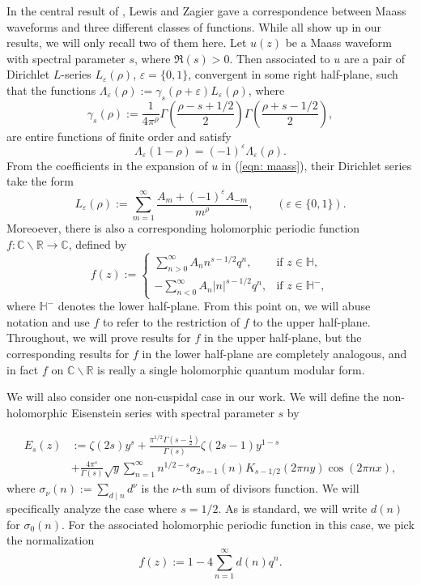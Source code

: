 \documentclass[12pt]{amsart}
\theoremstyle{definition}
\theoremstyle{plain}
\numberwithin{equation}{section}
\begin{document}
In the central result of \cite{lewis-zagier}, Lewis and Zagier gave a correspondence between Maass waveforms and three different classes of functions. 
While all show up in our results, we will only recall two of them here. Let $u(z)$ be a Maass waveform with spectral parameter $s$, where $\Re(s)>0$.
Then associated to $u$ are a pair of Dirichlet $L$-series $L_\varepsilon(\rho)$, $\varepsilon = \{0, 1\}$, convergent in some
right half-plane, such that the functions $\Lambda_{\varepsilon}(\rho) :=  \gamma_s(\rho+\varepsilon)L_\varepsilon(\rho)$, where
\[\gamma_s(\rho) := \frac{1}{4\pi^\rho}\Gamma\left(\frac{\rho-s+1/2}{2}\right) \Gamma\left(\frac{\rho+s-1/2}{2}\right),
\]
are entire functions of finite order and satisfy 
\[\Lambda_\varepsilon(1-\rho) = (-1)^\varepsilon \Lambda_\varepsilon(\rho).
\]
From the coefficients in the expansion of $u$ in (\ref{eqn: maass}), their Dirichlet series take the form
\[L_\varepsilon(\rho) := \sum_{m=1}^\infty \frac{A_m + (-1)^\varepsilon A_{-m}}{m^\rho}, \quad \quad (\varepsilon \in \{0,1\}). \]
Moreoever, there is also a corresponding holomorphic periodic function $f\colon \mathbb{C}\backslash \mathbb{R} \to \mathbb{C}$, defined by
\[f(z) := \begin{cases} \sum_{n>0}^\infty A_n n^{s-1/2} q^n, & \text{if } z \in \mathbb{H},\\
 	-\sum_{n<0}^\infty A_{n} |n|^{s-1/2} q^n, & \text{if } z \in \mathbb{H}^-,
 \end{cases}
\]
where $\mathbb{H}^-$ denotes the lower half-plane. 
From this point on, we will abuse notation and use $f$ to refer to the restriction of $f$ to the upper half-plane. Throughout, we will prove results for $f$ in the upper half-plane, but the corresponding results for $f$ in the lower half-plane are completely analogous, and in fact $f$ on $\mathbb{C} \backslash\mathbb{R}$ is really a single holomorphic quantum modular form. 

We will also consider one non-cuspidal case in our work. We will define the non-holomorphic Eisenstein series with spectral parameter $s$ by

\begin{equation}\begin{aligned} \label{eqn: maass eisenstein}
E_s(z) &:= \zeta(2s)y^s + \frac{\pi^{1/2}\Gamma(s-\frac{1}{2})}{\Gamma(s)}\zeta(2s-1)y^{1-s} \\&+ \frac{4\pi^s}{\Gamma(s)}\sqrt{y}\sum_{n=1}^\infty n^{1/2-s}\sigma_{2s-1}(n) K_{s-1/2}(2\pi ny) \cos(2\pi nx), 
\end{aligned}
\end{equation}
where $\sigma_\nu(n) := \sum_{d\mid n} d^\nu$ is the $\nu$-th sum of divisors function. We will specifically analyze the case where $s=1/2$. As is standard, we will write $d(n)$ for $\sigma_0(n).$ For the associated holomorphic periodic function in this case, we pick the normalization 
\[f(z):= 1-4\sum_{n=1}^\infty d(n)q^n.
\]
\end{document}
